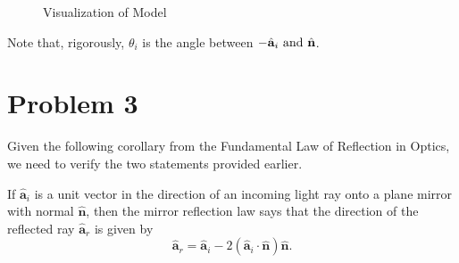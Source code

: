 \documentclass[12pt,a4paper]{article}
\begin{document}
\begin{solution}
\begin{figure}[H]
    \caption{Visualization of Model}
\end{figure}
\begin{remark}
    Note that, rigorously, $\theta_i$ is the angle between $-\hat{\mathbf{a}}_i \text{ and } \hat{\mathbf{n}}$.
\end{remark}
\end{solution}


\section*{Problem 3}
Given the following corollary from the Fundamental Law of Reflection in Optics, we need to verify the two statements provided earlier.
\begin{corollary}
    If $\hat{\mathbf{a}}_i$ is a unit vector in the direction of an incoming light ray onto a plane mirror with normal $\hat{\mathbf{n}}$, then the mirror reflection law says that the direction of the reflected ray $\hat{\mathbf{a}}_r$ is given by
    \begin{equation}\label{given}
        \hat{\mathbf{a}}_r=\hat{\mathbf{a}}_i-2\left(\hat{\mathbf{a}}_i \cdot \hat{\mathbf{n}}\right) \hat{\mathbf{n}}.
    \end{equation}

\end{corollary}
\end{document}
